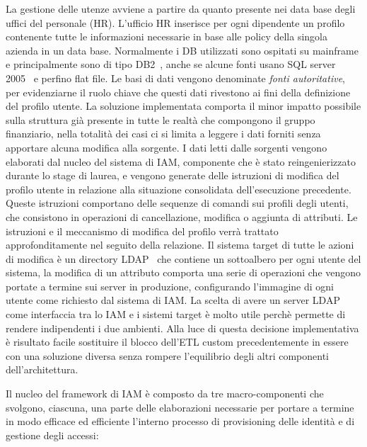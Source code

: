 La gestione delle utenze avviene a partire da quanto presente nei data base
degli uffici del personale (HR). 
L'ufficio HR inserisce per ogni dipendente un profilo contenente tutte le
informazioni necessarie in base alle policy della singola azienda in un data
base. Normalmente i DB utilizzati sono ospitati su mainframe e principalmente
sono di tipo DB2~\cite{DB2}, anche se alcune fonti usano SQL server
2005~\cite{SQLServer2005} e perfino flat file.
Le basi di dati vengono denominate \textit{fonti autoritative}, per evidenziarne
il ruolo chiave che questi dati rivestono ai fini della definizione del profilo utente. 
La soluzione implementata comporta il minor impatto possibile sulla struttura
già presente in tutte le realtà che compongono il gruppo finanziario, nella
totalità dei casi ci si limita a leggere i dati forniti senza apportare alcuna
modifica alla sorgente.
I dati letti dalle sorgenti vengono elaborati dal nucleo del sistema di IAM,
componente che è stato reingenierizzato durante lo stage di laurea, e vengono
generate delle istruzioni di modifica del profilo utente in relazione alla
situazione consolidata dell'esecuzione precedente. Queste istruzioni comportano
delle sequenze di comandi sui profili degli utenti, che consistono in operazioni
di cancellazione, modifica o aggiunta di attributi. 
Le istruzioni e il meccanismo di modifica del profilo verrà trattato
approfonditamente nel seguito della relazione.
Il sistema target di tutte le azioni di modifica è un directory LDAP~\cite{LDAP}
che contiene un sottoalbero per ogni utente del sistema, la modifica di un
attributo comporta una serie di operazioni che vengono portate a termine sui
server in produzione, configurando l'immagine di ogni utente come richiesto dal
sistema di IAM.
La scelta di avere un server LDAP come interfaccia tra lo IAM e i sistemi target
è molto utile perchè permette di rendere indipendenti i due ambienti. Alla luce
di questa decisione implementativa è risultato facile sostituire il blocco
dell'ETL custom precedentemente in essere con una soluzione diversa senza
rompere l'equilibrio degli altri componenti dell'architettura.

Il nucleo del framework di IAM è composto da tre macro-componenti che
svolgono, ciascuna, una parte delle elaborazioni necessarie per portare a
termine in modo efficace ed efficiente l’interno processo di provisioning delle
identità e di gestione degli accessi:

